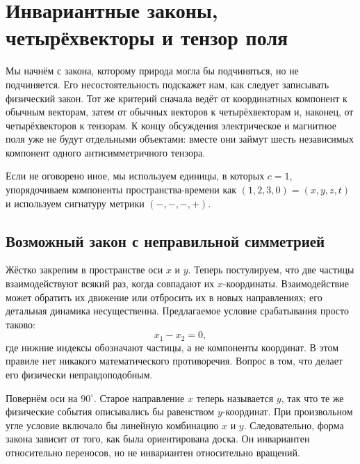 \chapter{Инвариантные законы, четырёхвекторы и тензор поля}

Мы начнём с закона, которому природа могла бы подчиняться, но не подчиняется. Его несостоятельность подскажет нам, как следует записывать физический закон. Тот же критерий сначала ведёт от координатных компонент к обычным векторам, затем от обычных векторов к четырёхвекторам и, наконец, от четырёхвекторов к тензорам. К концу обсуждения электрическое и магнитное поля уже не будут отдельными объектами: вместе они займут шесть независимых компонент одного антисимметричного тензора.

Если не оговорено иное, мы используем единицы, в которых \(c=1\), упорядочиваем компоненты пространства-времени как \((1,2,3,0)=(x,y,z,t)\) и используем сигнатуру метрики \((-,-,-,+)\).

\section{Возможный закон с неправильной симметрией}

Жёстко закрепим в пространстве оси \(x\) и \(y\). Теперь постулируем, что две частицы взаимодействуют всякий раз, когда совпадают их \(x\)-координаты. Взаимодействие может обратить их движение или отбросить их в новых направлениях; его детальная динамика несущественна. Предлагаемое условие срабатывания просто таково:
\begin{equation}
  x_1-x_2=0,
\end{equation}
где нижние индексы обозначают частицы, а не компоненты координат. В этом правиле нет никакого математического противоречия. Вопрос в том, что делает его физически неправдоподобным.

\begin{classroomqa}
\end{classroomqa}

Повернём оси на \(90^\circ\). Старое направление \(x\) теперь называется \(y\), так что те же физические события описывались бы равенством \(y\)-координат. При произвольном угле условие включало бы линейную комбинацию \(x\) и \(y\). Следовательно, форма закона зависит от того, как была ориентирована доска. Он инвариантен относительно переносов, но не инвариантен относительно вращений.

